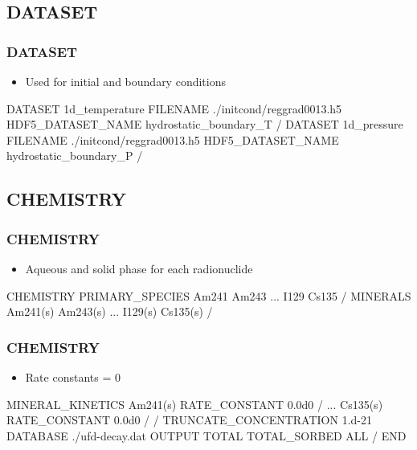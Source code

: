 \documentclass{beamer}
\newcommand\bluecomment[1]{{{\color{blue} #1}}}
\begin{document}
\subsection{DATASET}

\begin{frame}[fragile]\frametitle{DATASET}

\begin{itemize}
  \item Used for initial and boundary conditions
\end{itemize}

\begin{semiverbatim}
DATASET 1d_temperature
  FILENAME ./initcond/reggrad0013.h5
  HDF5_DATASET_NAME hydrostatic_boundary_T
/
DATASET 1d_pressure
  FILENAME ./initcond/reggrad0013.h5
  HDF5_DATASET_NAME hydrostatic_boundary_P
/
\end{semiverbatim}

\end{frame}

\subsection{CHEMISTRY}

\begin{frame}[fragile]\frametitle{CHEMISTRY}

\begin{itemize}
  \item Aqueous and solid phase for each radionuclide
\end{itemize}

\begin{semiverbatim}
CHEMISTRY
  PRIMARY_SPECIES
    Am241
    Am243
    ...
    I129
    Cs135
  /
  MINERALS
    Am241(s)
    Am243(s)
    ...
    I129(s)
    Cs135(s)
  /
\end{semiverbatim}

\end{frame}

\begin{frame}[fragile]\frametitle{CHEMISTRY}

\begin{itemize}
  \item Rate constants = 0
\end{itemize}

\begin{semiverbatim}
  MINERAL_KINETICS
    Am241(s)
      RATE_CONSTANT 0.0d0
    /
    \bluecomment{...}
    Cs135(s)
      RATE_CONSTANT 0.0d0
    /
  /
  TRUNCATE_CONCENTRATION 1.d-21
  DATABASE ./ufd-decay.dat
  OUTPUT
    TOTAL
    TOTAL_SORBED
    ALL
  /
END
\end{semiverbatim}

\end{frame}
\end{document}

